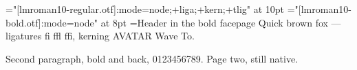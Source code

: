 
\font\body="[lmroman10-regular.otf]:mode=node;+liga;+kern;+tlig" at 10pt
\font\hd="[lmroman10-bold.otf]:mode=node" at 8pt
\headline={\hd Header in the bold face\hfil page \folio}
\body Quick brown fox --- ligatures fi ffl ffi, kerning AVATAR Wave To.\par
Second paragraph, {\hd bold} and back, 0123456789.
\vfill\eject
Page two, still native.
\bye
